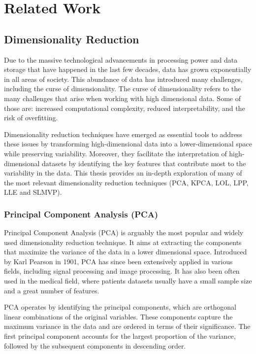 \chapter{Related Work}

\section{Dimensionality Reduction}
Due to the massive technological advancements in processing power and data storage that have happened in the last few decades, data has grown exponentially in all areas of society. This abundance of data has introduced many challenges, including the curse of dimensionality. The curse of dimensionality refers to the many challenges that arise when working with high dimensional data. Some of those are: increased computational complexity, reduced interpretability, and the risk of overfitting.

Dimensionality reduction techniques have emerged as essential tools to address these issues by transforming high-dimensional data into a lower-dimensional space while preserving variability. Moreover, they facilitate the interpretation of high-dimensional datasets by identifying the key features that contribute most to the variability in the data.
This thesis provides an in-depth exploration of many of the most relevant dimensionality reduction techniques (PCA, KPCA, LOL, LPP, LLE and SLMVP).

\subsection{Principal Component Analysis (PCA)}

Principal Component Analysis (PCA) is arguably the most popular and widely used dimensionality reduction technique. It aims at extracting the components that maximize the variance of the data in a lower dimensional space. Introduced by Karl Pearson in 1901, PCA has since been extensively applied in various fields, including signal processing and image processing. It has also been often used in the medical field, where patients datasets usually have a small sample size and a great number of features.

PCA operates by identifying the principal components, which are orthogonal linear combinations of the original variables. These components capture the maximum variance in the data and are ordered in terms of their significance. The first principal component accounts for the largest proportion of the variance, followed by the subsequent components in descending order.

